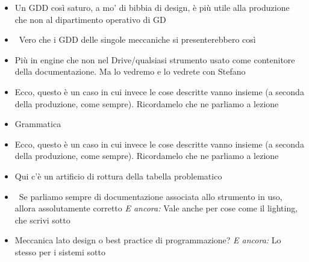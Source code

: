 {\begin{itemize}
  \item {} Un GDD così saturo, a mo' di bibbia di design, è più utile alla produzione che non al dipartimento operativo di GD
  \item {} \rvBene\ Vero che i GDD delle singole meccaniche si presenterebbero così
  \item {} Più in engine che non nel Drive/qualsiasi strumento usato come contenitore della documentazione. Ma lo vedremo e lo vedrete con Stefano
  \item {} Ecco, questo è un caso in cui invece le cose descritte vanno insieme (a seconda della produzione, come sempre). Ricordamelo che ne parliamo a lezione
  \item {} Grammatica
  \item {} Ecco, questo è un caso in cui invece le cose descritte vanno insieme (a seconda della produzione, come sempre). Ricordamelo che ne parliamo a lezione
  \item {} Qui c'è un artificio di rottura della tabella problematico
  \item {} \rvBene\ Se parliamo sempre di documentazione associata allo strumento in uso, allora assolutamente corretto \emph{E ancora:} Vale anche per cose come il lighting, che scrivi sotto
  \item {} Meccanica lato design o best practice di programmazione? \emph{E ancora:} Lo stesso per i sistemi sotto
\end{itemize}
}
